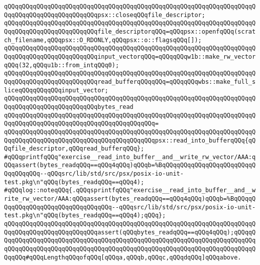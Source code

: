 \newline
\verb|qQQqqQQqqQQqqQQqqQQqqQQqqQQqqQQqqQQqqQQqqQQqqQQqqQQqqQQqqQQqqQQqqQQqqQQqqQQqqQQqqQQqqQQqqQQqqQQqpsx::closeqQQqfile_descriptor;|\newline
\newline
\newline
\newline
\verb|qQQqqQQqqQQqqQQqqQQqqQQqqQQqqQQqqQQqqQQqqQQqqQQqqQQqqQQqqQQqqQQqqQQqqQQqqQQqqQQqqQQqqQQqqQQqqQQqfile_descriptorqQQq=qQQqpsx::openfqQQq(scratch_filename,qQQqpsx::O_RDONLY,qQQqpsx::o::flagsqQQq[]);|\newline
\newline
\verb|qQQqqQQqqQQqqQQqqQQqqQQqqQQqqQQqqQQqqQQqqQQqqQQqqQQqqQQqqQQqqQQqqQQqqQQqqQQqqQQqqQQqqQQqqQQqqQQqinput_vectorqQQq=qQQqqQQqw1b::make_rw_vectorqQQq(32,qQQqu1b::from_intqQQq0);|\newline
\verb|qQQqqQQqqQQqqQQqqQQqqQQqqQQqqQQqqQQqqQQqqQQqqQQqqQQqqQQqqQQqqQQqqQQqqQQqqQQqqQQqqQQqqQQqqQQqqQQqread_bufferqQQqqQQq=qQQqqQQqwbs::make_full_sliceqQQqqQQqqQQqinput_vector;|\newline
\newline
\verb|qQQqqQQqqQQqqQQqqQQqqQQqqQQqqQQqqQQqqQQqqQQqqQQqqQQqqQQqqQQqqQQqqQQqqQQqqQQqqQQqqQQqqQQqqQQqqQQqbytes_read|\newline
\verb|qQQqqQQqqQQqqQQqqQQqqQQqqQQqqQQqqQQqqQQqqQQqqQQqqQQqqQQqqQQqqQQqqQQqqQQqqQQqqQQqqQQqqQQqqQQqqQQqqQQqqQQqqQQqqQQq=|\newline
\verb|qQQqqQQqqQQqqQQqqQQqqQQqqQQqqQQqqQQqqQQqqQQqqQQqqQQqqQQqqQQqqQQqqQQqqQQqqQQqqQQqqQQqqQQqqQQqqQQqqQQqqQQqqQQqqQQqpsx::read_into_bufferqQQq{qQQqfile_descriptor,qQQqread_bufferqQQq};|\newline
\newline
\verb|#qQQqprintfqQQq"exercise__read_into_buffer__and__write_rw_vector/AAA:qQQqassert(bytes_readqQQq==qQQq4qQQq)qQQqb=%BqQQqqQQqqQQqqQQqqQQqqQQqqQQqqQQqqQQq--qQQqsrc/lib/std/src/psx/posix-io-unit-test.pkg\n"qQQq(bytes_readqQQq==qQQq4);|\newline
\verb|#qQQqlog::noteqQQq{.qQQqsprintfqQQq"exercise__read_into_buffer__and__write_rw_vector/AAA:qQQqassert(bytes_readqQQq==qQQq4qQQq)qQQqb=%BqQQqqQQqqQQqqQQqqQQqqQQqqQQqqQQqqQQq--qQQqsrc/lib/std/src/psx/posix-io-unit-test.pkg\n"qQQq(bytes_readqQQq==qQQq4);qQQq};|\newline
\verb|qQQqqQQqqQQqqQQqqQQqqQQqqQQqqQQqqQQqqQQqqQQqqQQqqQQqqQQqqQQqqQQqqQQqqQQqqQQqqQQqqQQqqQQqqQQqqQQqassert(qQQqbytes_readqQQq==qQQq4qQQq);qQQqqQQqqQQqqQQqqQQqqQQqqQQqqQQqqQQqqQQqqQQqqQQqqQQqqQQqqQQqqQQqqQQqqQQqqQQqqQQqqQQqqQQqqQQqqQQqqQQqqQQqqQQqqQQqqQQqqQQqqQQqqQQqqQQqqQQqqQQqqQQqqQQqqQQq#qQQqLengthqQQqofqQQq[qQQqa,qQQqb,qQQqc,qQQqdqQQq]qQQqabove.|\newline
